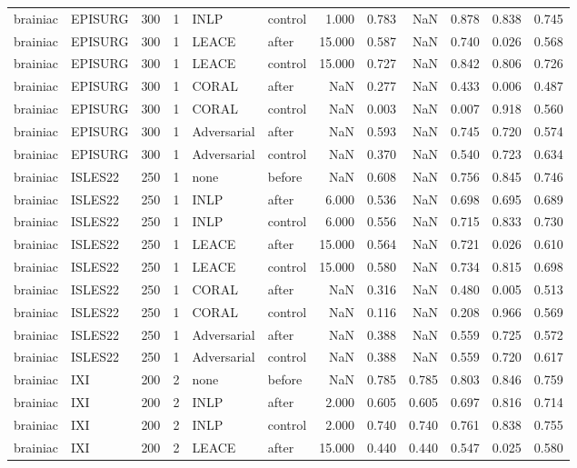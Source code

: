 \begin{tabular}{llrrllrrrrrr}
brainiac & EPISURG & 300 & 1 & INLP & control & 1.000 & 0.783 & NaN & 0.878 & 0.838 & 0.745 \\
brainiac & EPISURG & 300 & 1 & LEACE & after & 15.000 & 0.587 & NaN & 0.740 & 0.026 & 0.568 \\
brainiac & EPISURG & 300 & 1 & LEACE & control & 15.000 & 0.727 & NaN & 0.842 & 0.806 & 0.726 \\
brainiac & EPISURG & 300 & 1 & CORAL & after & NaN & 0.277 & NaN & 0.433 & 0.006 & 0.487 \\
brainiac & EPISURG & 300 & 1 & CORAL & control & NaN & 0.003 & NaN & 0.007 & 0.918 & 0.560 \\
brainiac & EPISURG & 300 & 1 & Adversarial & after & NaN & 0.593 & NaN & 0.745 & 0.720 & 0.574 \\
brainiac & EPISURG & 300 & 1 & Adversarial & control & NaN & 0.370 & NaN & 0.540 & 0.723 & 0.634 \\
brainiac & ISLES22 & 250 & 1 & none & before & NaN & 0.608 & NaN & 0.756 & 0.845 & 0.746 \\
brainiac & ISLES22 & 250 & 1 & INLP & after & 6.000 & 0.536 & NaN & 0.698 & 0.695 & 0.689 \\
brainiac & ISLES22 & 250 & 1 & INLP & control & 6.000 & 0.556 & NaN & 0.715 & 0.833 & 0.730 \\
brainiac & ISLES22 & 250 & 1 & LEACE & after & 15.000 & 0.564 & NaN & 0.721 & 0.026 & 0.610 \\
brainiac & ISLES22 & 250 & 1 & LEACE & control & 15.000 & 0.580 & NaN & 0.734 & 0.815 & 0.698 \\
brainiac & ISLES22 & 250 & 1 & CORAL & after & NaN & 0.316 & NaN & 0.480 & 0.005 & 0.513 \\
brainiac & ISLES22 & 250 & 1 & CORAL & control & NaN & 0.116 & NaN & 0.208 & 0.966 & 0.569 \\
brainiac & ISLES22 & 250 & 1 & Adversarial & after & NaN & 0.388 & NaN & 0.559 & 0.725 & 0.572 \\
brainiac & ISLES22 & 250 & 1 & Adversarial & control & NaN & 0.388 & NaN & 0.559 & 0.720 & 0.617 \\
brainiac & IXI & 200 & 2 & none & before & NaN & 0.785 & 0.785 & 0.803 & 0.846 & 0.759 \\
brainiac & IXI & 200 & 2 & INLP & after & 2.000 & 0.605 & 0.605 & 0.697 & 0.816 & 0.714 \\
brainiac & IXI & 200 & 2 & INLP & control & 2.000 & 0.740 & 0.740 & 0.761 & 0.838 & 0.755 \\
brainiac & IXI & 200 & 2 & LEACE & after & 15.000 & 0.440 & 0.440 & 0.547 & 0.025 & 0.580 \\

\end{tabular}
